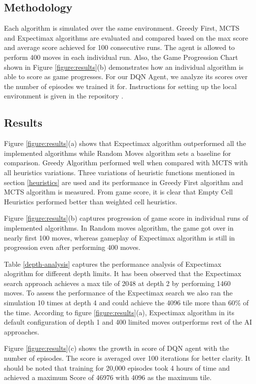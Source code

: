 \documentclass{svproc}
\begin{document}
    \subsection{Methodology}
    Each algorithm is simulated over the same environment. Greedy First, MCTS and Expectimax algorithms are evaluated and compared based on the max score and average score achieved for 100 consecutive runs. The agent is allowed to perform 400 moves in each individual run.  Also, the Game Progression Chart shown in Figure \ref{figure:results}(b) demonstrates how an individual algorithm is able to score as game progresses. For our DQN Agent, we analyze its scores over the number of episodes we trained it for. 
    Instructions for setting up the local environment is given in the repository \cite{AI-RKRS}.
    
    \subsection{Results}
    
    Figure \ref{figure:results}(a) shows that Expectimax algorithm outperformed all the implemented algorithms while Random Moves algorithm sets a baseline for comparison. Greedy Algorithm performed well when compared with MCTS with all heuristics variations. Three variations of heuristic functions mentioned in section \ref{heuristics} are used and its performance in Greedy First algorithm and MCTS algorithm is measured. From game score, it is clear that Empty Cell Heuristics performed better than weighted cell heuristics. 
    
    Figure \ref{figure:results}(b) captures progression of game score in individual runs of implemented algorithms. In Random moves algorithm, the game got over in nearly first 100 moves, whereas gameplay of Expectimax algorithm is still in progression even after performing 400 moves.
    
    Table \ref{depth-analysis} captures the performance analysis of Expectimax alogrithm for different depth limits. It has been observed that the Expectimax search approach achieves a max tile of 2048 at depth 2 by performing 1460 moves. To assess the performance of the Expectimax search we also ran the simulation 10 times at depth 4 and could achieve the 4096 tile more than 60\% of the time. According to figure \ref{figure:results}(a), Expectimax algorithm in its default configuration of depth 1 and 400 limited moves outperforms rest of the AI approaches.
    
    Figure \ref{figure:results}(c) shows the growth in score of DQN agent with the number of episodes. The score is averaged over 100 iterations for better clarity. It should be noted that training for 20,000 episodes took 4 hours of time and achieved a maximum Score of 46976 with 4096 as the maximum tile.
\end{document}
